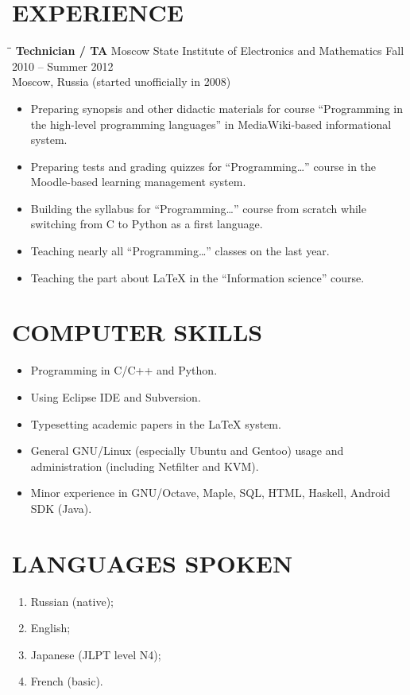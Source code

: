 \documentclass{res}
\begin{document}
\begin{resume}
\section{EXPERIENCE}
\vspace{-0.1in}	
\begin{tabbing}
\hspace{1.3in}\= \hspace{3.6in}\= \kill %
{\bf Technician / TA} \>Moscow State Institute of Electronics and Mathematics \>Fall 2010 -- Summer 2012\\
			\>Moscow, Russia \> (started unofficially in 2008)
\end{tabbing}      %
\begin{itemize}
	\item
		Preparing synopsis and other didactic materials for course ``Programming in the high-level programming languages'' in MediaWiki-based informational system.
	\item
		Preparing tests and grading quizzes for ``Programming\dots'' course in the Moodle-based learning management system.
	\item
		Building the syllabus for ``Programming\dots'' course from scratch while switching from C to Python as a first language.
	\item
		Teaching nearly all ``Programming\dots'' classes on the last year.
	\item
		Teaching the part about \LaTeX{} in the ``Information science'' course.
\end{itemize}

\section{COMPUTER SKILLS}          
\begin{itemize}
	\item
		Programming in C/C++ and Python.
	\item
		Using Eclipse IDE and Subversion.
	\item
		Typesetting academic papers in the \LaTeX{} system.
	\item
		General GNU/Linux (especially Ubuntu and Gentoo) usage and administration (including Netfilter and KVM).
	\item
		Minor experience in GNU/Octave, Maple, SQL, HTML, Haskell, Android SDK (Java).
\end{itemize}

\section{LANGUAGES SPOKEN}
\begin{enumerate}
	\item
		Russian (native);
	\item
		English;
	\item
		Japanese (JLPT level N4);
	\item
		French (basic).
\end{enumerate}
 

\end{resume}
\end{document}
